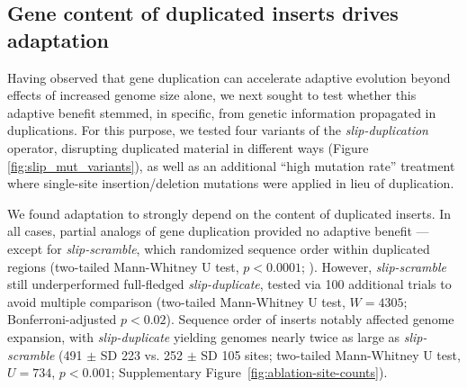 
\subsection{Gene content of duplicated inserts drives adaptation}

Having observed that gene duplication can accelerate adaptive evolution beyond effects of increased genome size alone, we next sought to test whether this adaptive benefit stemmed, in specific, from genetic information propagated in duplications.
For this purpose, we tested four variants of the \textit{slip-duplication} operator, disrupting duplicated material in different ways (Figure \ref{fig:slip_mut_variants}), as well as an additional ``high mutation rate'' treatment where single-site insertion/deletion mutations were applied in lieu of duplication.

We found adaptation to strongly depend on the content of duplicated inserts.
In all cases, partial analogs of gene duplication provided no adaptive benefit --- except for \textit{slip-scramble}, which randomized sequence order within duplicated regions (two-tailed Mann-Whitney U test, $p < 0.0001$; ).
However, \textit{slip-scramble} still underperformed full-fledged \textit{slip-duplicate}, tested via 100 additional trials to avoid multiple comparison (two-tailed Mann-Whitney U test, $W = 4305$; Bonferroni-adjusted $p < 0.02$).
Sequence order of inserts notably affected genome expansion, with \textit{slip-duplicate} yielding genomes nearly twice as large as \textit{slip-scramble} (491 $\pm$ SD 223 vs. 252 $\pm$ SD 105 sites; two-tailed Mann-Whitney U test, $U = 734$, $p < 0.001$; Supplementary Figure~\ref{fig:ablation-site-counts}).

